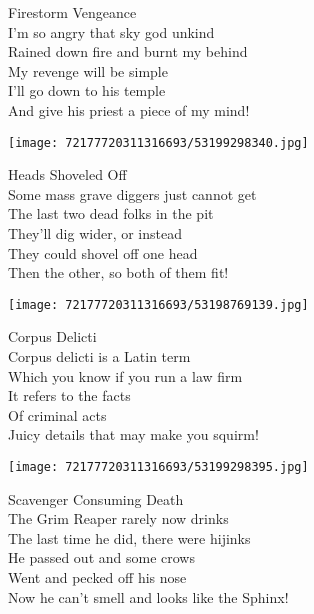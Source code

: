 \documentclass[10pt,letterpaper]{article}
\begin{document}
\begin{center}
Firestorm Vengeance\\
\vskip 0.2in
I'm so angry that sky god unkind\\
Rained down fire and burnt my behind\\
My revenge will be simple\\
I'll go down to his temple\\
And give his priest a piece of my mind!\\
\end{center}
\pagebreak

\begin{center}
\texttt{[image: 72177720311316693/53199298340.jpg]}
\end{center}

\begin{center}
Heads Shoveled Off\\
\vskip 0.2in
Some mass grave diggers just cannot get\\
The last two dead folks in the pit\\
They'll dig wider, or instead\\
They could shovel off one head\\
Then the other, so both of them fit!\\
\end{center}
\pagebreak

\begin{center}\texttt{[image: 72177720311316693/53198769139.jpg]}
\end{center}
\begin{center}
Corpus Delicti\\
\vskip 0.2in
Corpus delicti is a Latin term\\
Which you know if you run a law firm\\
It refers to the facts\\
Of criminal acts\\
Juicy details that may make you squirm!\\
\end{center}
\pagebreak

\begin{center}\texttt{[image: 72177720311316693/53199298395.jpg]}
\end{center}
\begin{center}
Scavenger Consuming Death\\
\vskip 0.2in
The Grim Reaper rarely now drinks\\
The last time he did, there were hijinks\\
He passed out and some crows\\
Went and pecked off his nose\\
Now he can't smell and looks like the Sphinx!\\
\end{center}
\pagebreak
\end{document}
